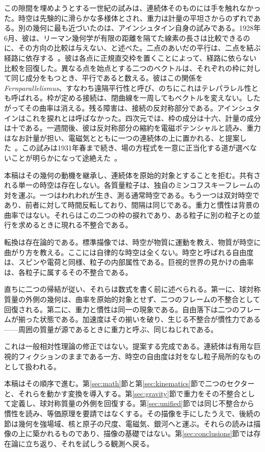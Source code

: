 \documentclass[a4paper]{article}
\begin{document}
この隙間を埋めようとする一世紀の試みは、連続体そのものには手を触れなかった。時空は先験的に滑らかな多様体とされ、重力は計量の平坦さからのずれである。別の幾何に最も近づいたのは、アインシュタイン自身の試みである。1928年6月、彼は、リーマン幾何学が有限の距離を隔てた線素の長さは比較できるのに、その方向の比較は与えない、と述べた。二点のあいだの平行は、二点を結ぶ経路に依存する~\cite{einstein1928fern}。彼は各点に正規直交枠を置くことによって、経路に依らない比較を回復した。異なる点を始点とする二つのベクトルは、それぞれの枠に対して同じ成分をもつとき、平行であると数える。彼はこの関係を\emph{Fernparallelismus}、すなわち遠隔平行性と呼び、のちにこれはテレパラレル性とも呼ばれる。枠が定める接続は、閉曲線を一周してもベクトルを変えない。したがってその曲率は消える。残る障害は、接続の反対称部分である。アインシュタインはこれを捩れとは呼ばなかった。四次元では、枠の成分は十六、計量の成分は十である。一週間後、彼は反対称部分の縮約を電磁ポテンシャルと読み、重力はなお計量が担い、電磁気とともに一つの連続体の上に置かれる、と提案した~\cite{einstein1928unified}。この試みは1931年春まで続き、場の方程式を一意に正当化する道が選べないことが明らかになって途絶えた~\cite{sauer2006}。

本稿はその幾何の動機を継承し、連続体を原始的対象とすることを拒む。共有される単一の時空は存在しない。各質量粒子は、独自のミンコフスキーフレームの対を運ぶ。一つはわれわれが生き、測る通常時空である。もう一つは双対時空であり、前者に対して時間反転しており、間隔は同じである。重力と慣性は背景の曲率ではない。それらはこの二つの枠の捩れであり、ある粒子に別の粒子との並行を求めるときに現れる不整合である。

転換は存在論的である。標準描像では、時空が物質に運動を教え、物質が時空に曲がり方を教える。ここには自律的な時空は全くない。時空と呼ばれる自由度は、スピンや電荷と同様、粒子の内部属性である。巨視的世界の見かけの曲率は、各粒子に属するその不整合である。

直ちに二つの帰結が従い、それらは数式を書く前に述べられる。第一に、球対称質量の外側の幾何は、曲率を原始的対象とせず、二つのフレームの不整合として回復される。第二に、重力と慣性は同一の現象である。自由落下は二つのフレームが揃った状態である。加速度はその揃いを破り、生じる不整合が慣性力である——周囲の質量が源であるときに重力と呼ぶ、同じねじれである。

これは一般相対性理論の修正ではない。提案する完成である。連続体は有用な巨視的フィクションのままである一方、時空の自由度は対をなし粒子局所的なものとして扱われる。

本稿はその順序で進む。第\ref{sec:math}節と第\ref{sec:kinematics}節で二つのセクターと、それらを動かす変換を導入する。第\ref{sec:gravity}節で重力をその不整合として定義し、球対称質量の外側を回復する。第\ref{sec:unified}節では同じ不整合から慣性を読み、等価原理を要請ではなくする。その描像を手にしたうえで、後続の節は幾何を強場域、核と原子の尺度、電磁気、銀河へと運ぶ。それらの読みは描像の上に築かれるものであり、描像の基礎ではない。第\ref{sec:conclusions}節では存在論に立ち返り、それを試しうる観測へ戻る。
\end{document}
